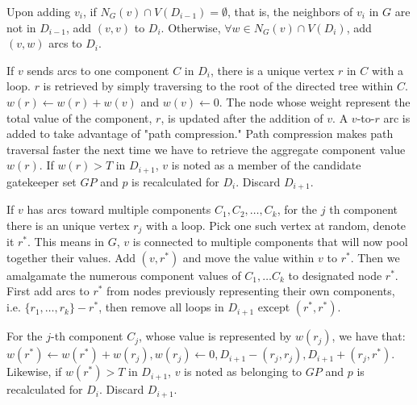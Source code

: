 \documentclass[a4paper]{article}
\begin{document}
Upon adding $v_i$, if $N_G(v)\cap V(D_{i-1}) = \emptyset $, that is, the neighbors of $v_i$ in $G$ are not in $D_{i-1}$, add $(v,v)$ to $D_{i}$. Otherwise, $ \forall w \in N_G(v)\cap V(D_{i})$, add $(v,w)$ arcs to $D_{i}$. 

If $v$ sends arcs to one component $C$ in $D_{i}$, there is a unique vertex $r$ in $C$ with a loop. $r$ is retrieved by simply traversing to the root of the directed tree within $C$. $w(r) \leftarrow w(r) + w(v)$ and $w(v) \leftarrow 0$. The node whose weight represent the total value of the component, $r$, is updated after the addition of $v$. A $v$-to-$r$ arc is added to take advantage of "path compression." Path compression makes path traversal faster the next time we have to retrieve the aggregate component value $w(r)$. If $w(r) > T$ in $D_{i+1}$, $v$ is noted as a member of the candidate gatekeeper set $GP$ and $p$ is recalculated for $D_i$. Discard $D_{i+1}$. 

If $v$ has arcs toward multiple components $C_1, C_2, \ldots, C_k$, for the $j$ th component there is an unique vertex $r_j$ with a loop. Pick one such vertex at random, denote it $r^*$. This means in $G$, $v$ is connected to multiple components that will now pool together their values. Add $(v,r^*)$ and move the value within $v$ to $r^*$. Then we amalgamate the numerous component values of $C_1, \ldots C_k$ to designated node $r^*$. First add arcs to $r^*$ from nodes previously representing their own components, i.e. $\{r_1,\ldots,r_k\} - r^*$, then remove all loops in $D_{i+1}$ except $(r^*,r^*)$. 

For the $j$-th component $C_j$, whose value is represented by $w(r_j)$, we have that: $w(r^*) \leftarrow w(r^*)+w(r_j), w(r_j) \leftarrow 0, D_{i+1} - (r_j,r_j), D_{i+1} + (r_j,r^*)$. Likewise, if $w(r^*)>T$ in $D_{i+1}$, $v$ is noted as belonging to $GP$ and $p$ is recalculated for $D_i$. Discard $D_{i+1}$.  
\end{document}
